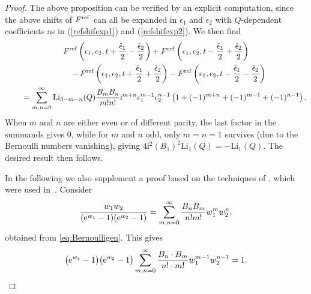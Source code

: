 \documentclass[pdftex]{sigma}
\numberwithin{equation}{section}
\begin{document}
\begin{proof}

The above proposition can be verified by an explicit computation, since the above shifts of $F^{\rm ref}$ can all be expanded in $\epsilon_1$ and $\epsilon_2$ with $Q$-dependent coefficients as in (\ref{refshifexp1}) and (\ref{refshifexp2}). We then find
\begin{gather*}
 F^{{\rm ref}}\left(\epsilon_1,\epsilon_2,t+\frac{\check{\epsilon}_1}{2}-\frac{\check{\epsilon}_2}{2}\right)+ F^{{\rm ref}}\left(\epsilon_1,\epsilon_2,t-\frac{\check{\epsilon}_1}{2}+\frac{\check{\epsilon}_2}{2}\right) \\
 \qquad\quad{} -F^{{\rm ref}}\left(\epsilon_1,\epsilon_2,t+\frac{\check{\epsilon}_1}{2}+\frac{\check{\epsilon}_2}{2}\right)-F^{{\rm ref}}\left(\epsilon_1,\epsilon_2,t-\frac{\check{\epsilon}_1}{2}-\frac{\check{\epsilon}_2}{2}\right) \\
\qquad{}=\sum_{m,n=0}^{\infty}{\rm Li}_{3-m-n}(Q) \frac{B_m B_n}{m! n!} \mathrm{i}^{m+n} \epsilon_1^{m-1} \epsilon_2^{n-1}\left(1+(-1)^{m+n}+(-1)^{m-1}+(-1)^{n-1}\right).
 \end{gather*}
When $m$ and $n$ are either even or of different parity, the last factor in the summands gives $0$, while for $m$ and $n$ odd, only $m=n=1$ survives (due to the Bernoulli numbers vanishing), giving $4 \mathrm{i}^2 (B_1)^2 \mathrm{Li}_1(Q)=-\mathrm{Li}_1(Q)$. The desired result then follows.

In the following we also supplement a proof based on the techniques of \cite{Iwaki2}, which were used in~\cite{alim2020difference}. Consider
\begin{equation*}
 \frac{w_1 w_2}{({\rm e}^{w_1}-1)({\rm e}^{w_2}-1)}= \sum_{m,n=0}^{\infty} \frac{B_n B_m}{n! m!} w_1^m w_2^n,
\end{equation*}
obtained from \eqref{eq:Bernoulligen}. This gives
\begin{equation}\label{eq:diffeqrep}
 \big({\rm e}^{w_1}-1\big)\big({\rm e}^{w_2}-1\big) \sum_{m,n=0}^{\infty} \frac{B_n \cdot B_m}{n! \cdot m!} w_1^{m-1} w_2^{n-1}=1.
\end{equation}


\end{proof}
\end{document}
